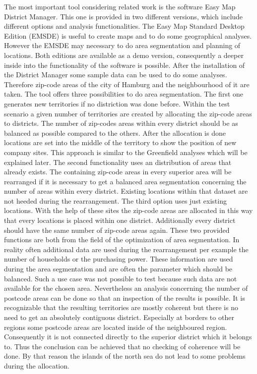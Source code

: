 The most important tool considering related work is the software Easy Map District Manager. This one is provided in two different versions, which include different options and analysis functionalities. The Easy Map Standard Desktop Edition (EMSDE) is useful to create maps and to do some geographical analyses. However the EMSDE may necessary to do area segmentation and planning of locations. Both editions are available as a demo version, consequently a deeper inside into the functionality of the software is possible. After the installation of the District Manager some sample data can be used to do some analyses. Therefore zip-code areas of the city of Hamburg and the neighbourhood of it are taken. The tool offers three possibilities to do area segmentation. The first one generates new territories if no distriction was done before. Within the test scenario a given number of territories are created by allocating the zip-code areas to districts. The number of zip-codes areas within every district should be as balanced as possible compared to the others. After the allocation is done locations are set into the middle of the territory to show the position of new company sites. This approach is similar to the Greenfield analyses which will be explained later. The second functionality uses an distribution of areas that already exists. The containing zip-code areas in every superior area will be rearranged if it is necessary to get a balanced area segmentation concerning the number of areas within every district. Existing locations within that dataset are not heeded during the rearrangement. The third option uses just existing locations. With the help of these sites the zip-code areas are allocated in this way that every locations is placed within one district. Additionally every district should have the same number of zip-code areas again. These two provided functions are both from the field of the optimization of area segmentation. In reality often additional data are used during the rearrangement per example the number of households or the purchasing power. These information are used during the area segmentation and are often the parameter which should be balanced. Such a use case was not possible to test because such data are not available for the chosen area. Nevertheless an analysis concerning the number of postcode areas can be done so that an inspection of the results is possible. It is recognizable that the resulting territories are mostly coherent but there is no need to get an absolutely contiguous district. Especially at borders to other regions some postcode areas are located inside of the neighboured region. Consequently it is not connected directly to the superior district which it belongs to. Thus the conclusion can be achieved that no checking of coherence will be done. By that reason the islands of the north sea do not lead to some problems during the allocation. 


